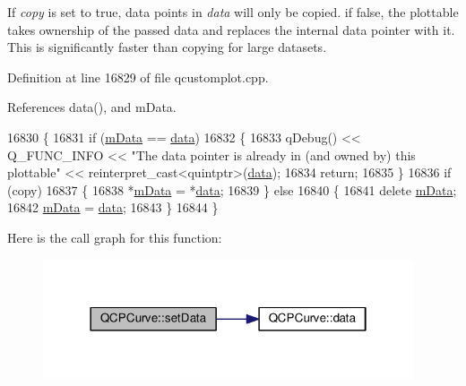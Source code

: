 If {\itshape copy} is set to true, data points in {\itshape data} will only be copied. if false, the plottable takes ownership of the passed data and replaces the internal data pointer with it. This is significantly faster than copying for large datasets. 

Definition at line 16829 of file qcustomplot.\+cpp.



References data(), and m\+Data.


\begin{DoxyCode}
16830 \{
16831   \textcolor{keywordflow}{if} (\hyperlink{class_q_c_p_curve_a88d533e455bca96004b049e99168731b}{mData} == \hyperlink{class_q_c_p_curve_a9ac194d35d4f334923aac9df1bf599ca}{data})
16832   \{
16833     qDebug() << Q\_FUNC\_INFO << \textcolor{stringliteral}{"The data pointer is already in (and owned by) this plottable"} << \textcolor{keyword}{
      reinterpret\_cast<}quintptr\textcolor{keyword}{>}(\hyperlink{class_q_c_p_curve_a9ac194d35d4f334923aac9df1bf599ca}{data});
16834     \textcolor{keywordflow}{return};
16835   \}
16836   \textcolor{keywordflow}{if} (copy)
16837   \{
16838     *\hyperlink{class_q_c_p_curve_a88d533e455bca96004b049e99168731b}{mData} = *\hyperlink{class_q_c_p_curve_a9ac194d35d4f334923aac9df1bf599ca}{data};
16839   \} \textcolor{keywordflow}{else}
16840   \{
16841     \textcolor{keyword}{delete} \hyperlink{class_q_c_p_curve_a88d533e455bca96004b049e99168731b}{mData};
16842     \hyperlink{class_q_c_p_curve_a88d533e455bca96004b049e99168731b}{mData} = \hyperlink{class_q_c_p_curve_a9ac194d35d4f334923aac9df1bf599ca}{data};
16843   \}
16844 \}
\end{DoxyCode}


Here is the call graph for this function\+:\nopagebreak
\begin{figure}[H]
\begin{center}
\leavevmode
\includegraphics[width=310pt]{class_q_c_p_curve_a631ac886708460013b30052f49cbc9da_cgraph}
\end{center}
\end{figure}


\hypertarget{class_q_c_p_curve_affe80e011e2ced62a88f614acd6ab8d1}{}
